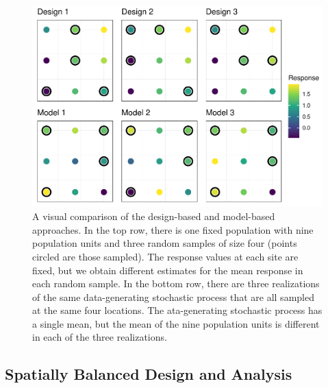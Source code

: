 \documentclass[]{elsarticle} %
\begin{document}
\begin{figure}
\includegraphics[width=1\linewidth]{manuscript_files/figure-latex/fig1-1} \caption{A visual comparison of the design-based and model-based approaches. In the top row, there is one fixed population with nine population units and three random samples of size four (points circled are those sampled). The response values at each site are fixed, but we obtain different estimates for the mean response in each random sample. In the bottom row, there are three realizations of the same data-generating stochastic process that are all sampled at the same four locations. The ata-generating stochastic process has a single mean, but the mean of the nine population units is different in each of the three realizations.}\label{fig:fig1}
\end{figure}

\hypertarget{subsec:spb_design}{%
\subsection{Spatially Balanced Design and
Analysis}\label{subsec:spb_design}}
\end{document}
